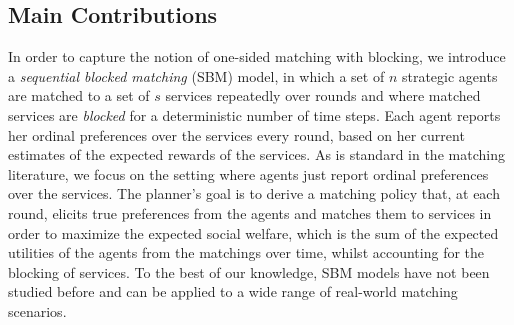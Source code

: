 \documentclass[letterpaper,11pt]{article}
\newcommand{\kibitz}[2]{\ifnum\Comments=1{\color{#1}{#2}}\fi}
\newcommand{\dm}[1]{\kibitz{ForestGreen}{[Deb: #1]}}
\newcommand{\todo}[1]{\kibitz{red}{[Nick: #1]}}
\begin{document}
\subsection{Main Contributions}
In order to capture the notion of one-sided matching with blocking, we introduce a \emph{sequential blocked matching} (SBM) model, in which a set of $n$ strategic agents are matched to a set of $s$ services repeatedly over rounds 
 and where matched services are \emph{blocked} for a deterministic number of time steps. Each agent reports her ordinal preferences over the services every round, based on her current estimates of the expected rewards of the services. As is standard in the matching literature, we focus on the setting where agents just report ordinal preferences over the services. 
The planner's goal is to derive a matching policy that, at each round, 
elicits true preferences from the agents and matches them to services in order to maximize the expected social welfare, 
which is the sum of the expected utilities of the agents from the matchings over time, whilst accounting for the blocking of services.
To the best of our knowledge, SBM models have not been studied before and can be applied to a wide range of real-world matching scenarios. %



\end{document}
